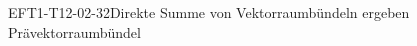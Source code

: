 
\begin{KORO}{EFT1-T12-02-32}{Direkte Summe von Vektorraumbündeln ergeben Prävektorraumbündel}
\end{KORO}
